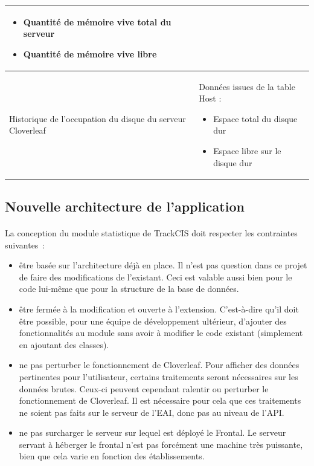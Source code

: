 \begin{table}[H]
\begin{tabular}{| p{5cm} | p{8cm} |}
\begin{itemize}
						  \item Quantité de mémoire vive total du serveur
						  \item Quantité de mémoire vive libre
						\end{itemize}
						\\
					\hline
						Historique de l'occupation du disque du serveur Cloverleaf
						&
						Données issues de la table Host :
						\begin{itemize}
						  \item Espace total du disque dur
						  \item Espace libre sur le disque dur
						\end{itemize}
						\\
					\hline
				\end{tabular}
			\end{table}
		
		
		\subsection{Nouvelle architecture de l'application}
			\paragraph{}%
			La conception du module statistique de TrackCIS doit respecter les
			contraintes suivantes~:
			\begin{itemize}%
			  \item être basée sur l'architecture déjà en place. Il n'est pas question
			  dans ce projet de faire des modifications de l'existant. Ceci est
			  valable aussi bien pour le code lui-même que pour la structure de la base
			  de données.
			  \item être fermée à la modification et ouverte à l'extension. C'est-à-dire
			  qu'il doit être possible, pour une équipe de développement ultérieur,
			  d'ajouter des fonctionnalités au module sans avoir à modifier le code
			  existant (simplement en ajoutant des classes).
			  \item ne pas perturber le fonctionnement de Cloverleaf. Pour afficher des
			  données pertinentes pour l'utilisateur, certains traitements seront
			  nécessaires sur les données brutes. Ceux-ci peuvent cependant ralentir ou
			  perturber le fonctionnement de Cloverleaf. Il est nécessaire pour cela que
			  ces traitements ne soient pas faits sur le serveur de l'EAI, donc pas au
			  niveau de l'API.
			  \item ne pas surcharger le serveur sur lequel est déployé le Frontal. Le
			  serveur servant à héberger le frontal n'est pas forcément une machine très
			  puissante, bien que cela varie en fonction des établissements.
			\end{itemize}
			
